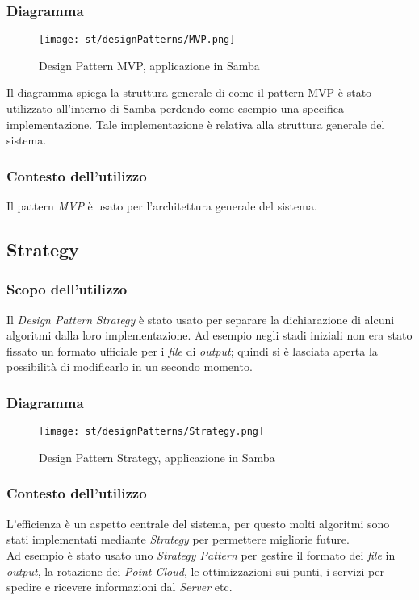\subsubsection{Diagramma}
\begin{figure}[H] 
    \centering 
    \texttt{[image: st/designPatterns/MVP.png]} 
    \caption{Design Pattern MVP, applicazione in Samba}
\end{figure}
Il diagramma spiega la struttura generale di come il pattern MVP è stato utilizzato all'interno di Samba perdendo come esempio una specifica implementazione. Tale implementazione è relativa alla struttura generale del sistema.
\subsubsection{Contesto dell'utilizzo}
Il pattern \emph{MVP} è usato per l'architettura generale del sistema. 

\subsection{Strategy}
\subsubsection{Scopo dell'utilizzo}
Il \emph{Design Pattern} \emph{Strategy} è stato usato per separare la dichiarazione di alcuni algoritmi dalla loro implementazione. Ad esempio negli stadi iniziali non era stato fissato un formato ufficiale per i \emph{file} di \emph{output}; quindi si è lasciata aperta la possibilità di modificarlo in un secondo momento.
\subsubsection{Diagramma}
\begin{figure}[H] 
    \centering 
    \texttt{[image: st/designPatterns/Strategy.png]} 
    \caption{Design Pattern Strategy, applicazione in Samba}
\end{figure}
\subsubsection{Contesto dell'utilizzo}
L'efficienza è un aspetto centrale del sistema, per questo molti algoritmi sono stati implementati mediante \emph{Strategy} per permettere migliorie future.\\
Ad esempio è stato usato uno \emph{Strategy Pattern} per gestire il formato dei \emph{file} in \emph{output}, la rotazione dei \emph{Point Cloud}, le ottimizzazioni sui punti, i servizi per spedire e ricevere informazioni dal \emph{Server} etc.

